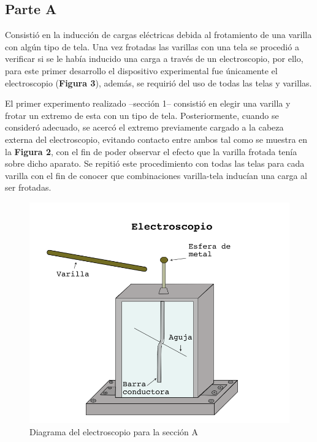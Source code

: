 \documentclass[letterpaper, 11 pt]{article}
\begin{document}
\begin{multicols*}{2}
\section*{Parte A}

Consistió en la inducción de cargas eléctricas debida al frotamiento de una varilla con algún tipo de tela. Una vez frotadas las varillas con una tela se procedió a verificar si se le había inducido una carga a través de un electroscopio, por ello, para este primer desarrollo el dispositivo experimental fue únicamente el electroscopio (\textbf{Figura 3}), además, se requirió del uso de todas las telas y varillas. 


El primer experimento realizado --sección 1-- consistió en elegir una varilla y frotar un extremo de esta con un tipo de tela. Posteriormente, cuando se consideró adecuado, se acercó el extremo previamente cargado a la cabeza externa del electroscopio, evitando contacto entre ambos tal como se muestra en la \textbf{Figura 2}, con el fin de poder observar el efecto que la varilla frotada tenía sobre dicho aparato. Se repitió este procedimiento con todas las telas para cada varilla con el fin de conocer que combinaciones varilla-tela inducían una carga al ser frotadas.

\begin{figure}[H]
    \centering
    \includegraphics[scale=0.30]{el mamalon parte 1.png}
    \caption{Diagrama del electroscopio para la sección A}
\end{figure}


\end{multicols*}
\end{document}
